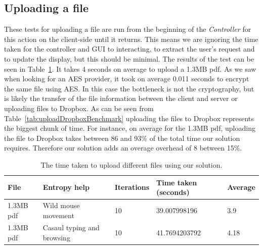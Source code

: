 \documentclass[12pt, titlepage]{article}
\begin{document}
\subsection{Uploading a file}
These tests for uploading a file are run from the beginning of the \textit{Controller} for this action on the client-side until it returns. This means we are ignoring the time taken for the controller and GUI to interacting, to extract the user's request and to update the display, but this should be minimal.
\newline \indent The results of the test can be seen in Table~\ref{tab:uploadBenchmark}. It takes 4 seconds on average to upload a 1.3MB pdf. As we saw when looking for an AES provider, it took on average 0.011 seconds to encrypt the same file using AES. In this case the bottleneck is not the cryptography, but is likely the transfer of the file information between the client and server or uploading files to Dropbox. As can be seen from Table~\ref{tab:uploadDropboxBenchmark} uploading the files to Dropbox represents the biggest chunk of time. For instance, on average for the 1.3MB pdf, uploading the file to Dropbox takes between 86 and 93\% of the total time our solution requires. Therefore our solution adds an overage overhead of 8 between 15\%.

\bigskip
\begin{table}[h!]
\begin{center}
    \begin{tabular}{ | l | l | l | l | l |}
    \hline
    \textbf{File} & \textbf{Entropy help} & \textbf{Iterations} & \textbf{Time taken (seconds)} & \textbf{Average} \\ \hline
    1.3MB pdf & Wild mouse movement & 10 & 39.007998196 & 3.9 \\ \hline
    1.3MB pdf & Casaul typing and browsing & 10 & 41.7694203792 & 4.18 \\ \hline
    
    \end{tabular}
    \caption{The time taken to upload different files using our solution.} \label{tab:uploadBenchmark}
    \end{center}
\end{table}
\end{document}
